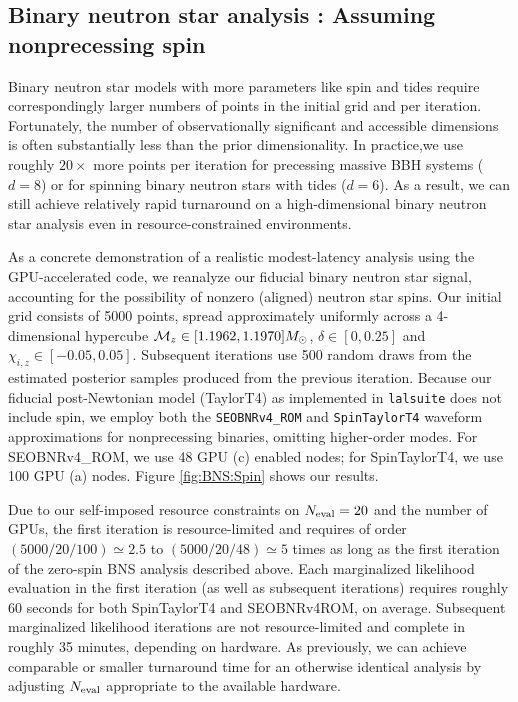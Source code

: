\documentclass[twocolumn,prd,nofootinbib]{revtex4}
\newcommand\AddedResponse[1]{{\color{blue} {#1}}}
\newcommand{\mc}{{\cal M}}
\begin{document}
\subsection{Binary neutron star analysis : Assuming  nonprecessing spin}
\label{sec:sub:BNS_spin}


Binary neutron star models with more parameters like spin and tides require correspondingly larger numbers of points in the
  initial grid and per iteration.  Fortunately, the number of observationally significant and accessible dimensions is often
  substantially less than the  prior  dimensionality.  In practice,we use roughly $20\times$ more points per
  iteration for precessing massive BBH systems ($d=8$) or for spinning binary neutron stars with tides ($d=6$).    As a
  result, we can still achieve relatively rapid turnaround on a high-dimensional binary neutron star analysis even in
  resource-constrained environments.

As a concrete demonstration of a realistic modest-latency analysis using the GPU-accelerated code, we reanalyze our fiducial binary
neutron star signal, accounting for the possibility of nonzero (aligned) neutron star spins.  Our initial grid consists
of 5000 points, spread \AddedResponse{approximately} uniformly across a 4-dimensional
hypercube $\mc_z\in[1.1962,1.1970] M_\odot$, $\delta \in[0,0.25]$ and $\chi_{i,z}\in[-0.05,0.05]$.  Subsequent
iterations use 500 random draws from the estimated posterior samples produced from the previous iteration.  
Because  our fiducial post-Newtonian model (TaylorT4) as implemented in \texttt{lalsuite}\cite{lalsuite} does not include spin, we
employ both the \texttt{SEOBNRv4\_ROM} and \texttt{SpinTaylorT4} waveform approximations for nonprecessing binaries,
omitting higher-order modes.   For SEOBNRv4\_ROM, we use 48 GPU (c) enabled nodes; for SpinTaylorT4, we use 100 GPU (a) nodes.
%
Figure \ref{fig:BNS:Spin} shows our results.
%


Due to our self-imposed resource constraints on $N_{\rm eval}=20$ and the number of GPUs, the first iteration is
resource-limited and requires
of order $(5000/20/100)\simeq
2.5$ to $(5000/20/48)\simeq
 5$ times as long as the first iteration of the zero-spin BNS analysis described above.  Each marginalized likelihood
 evaluation in the first iteration (as well as subsequent iterations) requires roughly 60 seconds for both SpinTaylorT4 and SEOBNRv4ROM, on average.   Subsequent
marginalized likelihood iterations are not resource-limited and complete in roughly 35 minutes, depending on hardware.
As previously, we can achieve comparable or smaller turnaround time for an otherwise identical analysis by adjusting $N_{\rm eval}$ appropriate to the available hardware.
\end{document}

